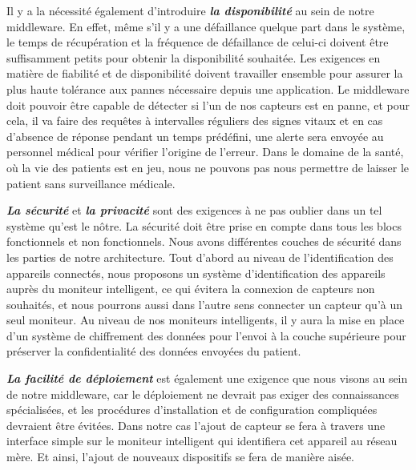 Il y a la nécessité également d'introduire \textbf{\textit{la disponibilité}} au sein de notre middleware. En effet, même s'il y a une défaillance quelque part dans le système, le temps de récupération et la fréquence de défaillance de celui-ci doivent être suffisamment petits pour obtenir la disponibilité souhaitée. Les exigences en matière de fiabilité et de disponibilité doivent travailler ensemble pour assurer la plus haute tolérance aux pannes nécessaire depuis une application. Le middleware doit pouvoir être capable de détecter si l’un de nos capteurs est en panne, et pour cela, il va faire des requêtes à intervalles réguliers des signes vitaux et en cas d’absence de réponse pendant un temps prédéfini, une alerte sera envoyée au personnel médical pour vérifier l’origine de l’erreur. Dans le domaine de la santé, où la vie des patients est en jeu, nous ne pouvons pas nous permettre de laisser le patient sans surveillance médicale.

\textbf{\textit{La sécurité}} et \textbf{\textit{la privacité}} sont des exigences à ne pas oublier dans un tel système qu'est le nôtre. La sécurité doit être prise en compte dans tous les blocs fonctionnels et non fonctionnels. Nous avons différentes couches de sécurité dans les parties de notre architecture. Tout d’abord au niveau de l’identification des appareils connectés, nous proposons un système d’identification des appareils auprès du moniteur intelligent, ce qui évitera la connexion de capteurs non souhaités, et nous pourrons aussi dans l’autre sens connecter un capteur qu’à un seul moniteur. Au niveau de nos moniteurs intelligents, il y aura la mise en place d’un système de chiffrement des données pour l’envoi à la couche supérieure pour préserver la confidentialité des données envoyées du patient.

\textbf{\textit{La facilité de déploiement}} est également une exigence que nous visons au sein de notre middleware, car le déploiement ne devrait pas exiger des connaissances spécialisées, et les procédures d'installation et de configuration compliquées devraient être évitées. Dans notre cas l’ajout de capteur se fera à travers une interface simple sur le moniteur intelligent qui identifiera cet appareil au réseau mère. Et ainsi, l’ajout de nouveaux dispositifs se fera de manière aisée.